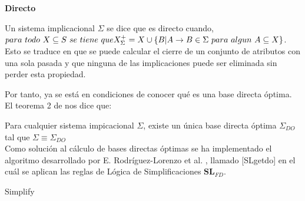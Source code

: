 \textbf{Directo}

Un sistema implicacional \( \Sigma \) se dice que es directo cuando, \( para \ todo \ X \subseteq S \ se \ tiene \ que \\ X^+_{\Sigma} =  X \cup \{ B | A \to B \in \Sigma \ para \ algun \ A \subseteq X \} \). Esto se traduce en que se puede calcular el cierre de un conjunto de atributos con una sola pasada y que ninguna de las implicaciones puede ser eliminada sin perder esta propiedad.

Por tanto, ya se est\'a en condiciones de conocer qu\'e es una base directa \'optima.\\

El teorema 2 de \cite{DO2} nos dice que:

Para cualquier sistema impicacional \(\Sigma\), existe un \'unica base directa \'optima \(\Sigma_{DO}\) tal que \(\Sigma \equiv \Sigma_{DO} \)\\

Como soluci\'on al c\'alculo de bases directas \'optimas se ha implementado el algoritmo desarrollado por  E. Rodr\'iguez-Lorenzo et al. \cite{DO2}, llamado [SLgetdo] en el cu\'al se aplican las reglas de L\'ogica de Simplificaciones \(\textbf{SL}_{FD}\).\\

\IncMargin{1em}
\begin{algorithm}[H]
    \SetAlgoLined
    \DontPrintSemicolon
    \caption{Simplify}\label{alg:4}
\end{algorithm}\DecMargin{1em}

